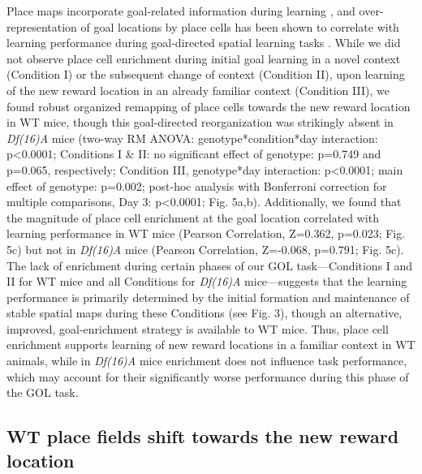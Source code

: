 Place maps incorporate goal-related information during learning \citep{Breese1989}\citep{Dupret2010b}\citep{Fyhn2002}\citep{Gothard1996}\citep{Hok2007}\citep{Hollup2001b}\citep{Kobayashi1997}, and over-representation of goal locations by place cells has been shown to correlate with learning performance during goal-directed spatial learning tasks \citep{Dupret2010a}\citep{Hollup2001b}.  While we did not observe place cell enrichment during initial goal learning in a novel context (Condition I) or the subsequent change of context (Condition II), upon learning of the new reward location in an already familiar context (Condition III), we found robust organized remapping of place cells towards the new reward location in WT mice, though this goal-directed reorganization was strikingly absent in \emph{Df(16)A\super{+/-}} mice (two-way RM ANOVA: genotype*condition*day interaction: p<0.0001; Conditions I \& II: no significant effect of genotype:  p=0.749 and p=0.065, respectively; Condition III, genotype*day interaction: p<0.0001; main effect of genotype: p=0.002; post-hoc analysis with Bonferroni correction for multiple comparisons, Day 3: p<0.0001; Fig. 5a,b).  Additionally, we found that the magnitude of place cell enrichment at the goal location correlated with learning performance in WT mice (Pearson Correlation, Z=0.362, p=0.023; Fig. 5c) but not in \emph{Df(16)A\super{+/-}} mice (Pearson Correlation, Z=-0.068, p=0.791; Fig. 5c). The lack of enrichment during certain phases of our GOL task—Conditions I and II for WT mice and all Conditions for \emph{Df(16)A\super{+/-}} mice—suggests that the learning performance is primarily determined by the initial formation and maintenance of stable spatial maps during these Conditions (see Fig. 3), though an alternative, improved, goal-enrichment strategy is available to WT mice. Thus, place cell enrichment supports learning of new reward locations in a familiar context in WT animals, while in \emph{Df(16)A\super{+/-}} mice enrichment does not influence task performance, which may account for their significantly worse performance during this phase of the GOL task.

\subsection{WT place fields shift towards the new reward location}

